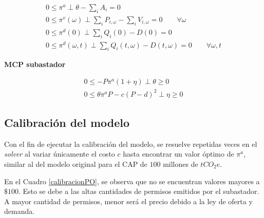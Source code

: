 \begin{footnotesize}
\begin{align}
0 \leq \pi^a \perp \theta - \sum_{i}A_i= 0\\
0 \leq \pi^v(\omega) \perp \sum_{i}P_{i,\omega} - \sum_{i}V_{i,\omega} = 0 \qquad \forall \omega\\
0 \leq \pi^d(0) \perp \sum_{i}Q_i(0) - D(0)= 0\\
 0 \leq \pi^d(\omega,t) \perp \sum_{i}Q_i(t,\omega) - D(t,\omega) = 0 \qquad \forall \omega,t
\end{align}
\end{footnotesize}

\textbf{MCP subastador}

\begin{footnotesize}
\begin{align}
0\leq -P\pi^a(1+\eta) \perp \theta \geq 0 \label{compllag33}\\
0 \leq \theta \pi^a P - c(P-d)^2 \perp \eta \geq 0 \label{compllag331}
\end{align}
\end{footnotesize}

\subsection{Calibración del modelo}

Con el fin de ejecutar la calibración del modelo, se resuelve repetidas veces en el \textit{solver} al variar únicamente el costo $c$ hasta encontrar un valor óptimo de $\pi^a $, similar al del modelo original para el CAP de $100$ millones de $tCO_{2}e$.     
\vspace{2.5mm}

En el Cuadro \ref{calibracionPO}, se observa que no se encuentran valores mayores a $\$100$. Esto se debe a las altas cantidades de permisos emitidos por el subastador. A mayor cantidad de permisos, menor será el precio debido a la ley de oferta y demanda.
\vspace{2.5mm}

